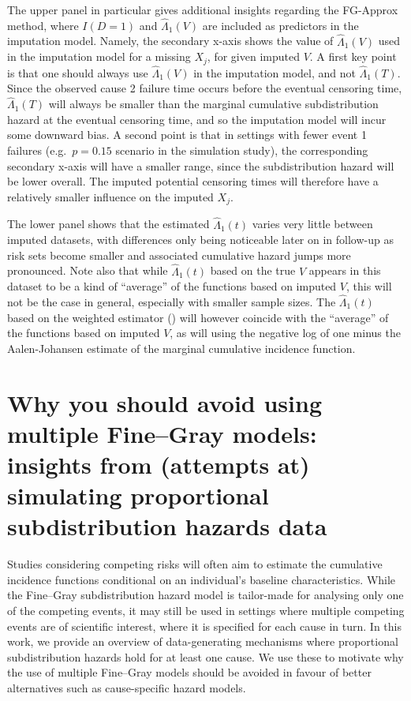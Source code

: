 \documentclass[
  letterpaper,
  DIV=11,
  numbers=noendperiod]{scrreprt}
\begin{document}
The upper panel in particular gives additional insights regarding the
FG-Approx method, where \(I(D = 1)\) and \(\hat{\Lambda}_1(V)\) are
included as predictors in the imputation model. Namely, the secondary
x-axis shows the value of \(\hat{\Lambda}_1(V)\) used in the imputation
model for a missing \(X_j\), for given imputed \(V\). A first key point
is that one should always use \(\hat{\Lambda}_1(V)\) in the imputation
model, and not \(\hat{\Lambda}_1(T)\). Since the observed cause 2
failure time occurs before the eventual censoring time,
\(\hat{\Lambda}_1(T)\) will always be smaller than the marginal
cumulative subdistribution hazard at the eventual censoring time, and so
the imputation model will incur some downward bias. A second point is
that in settings with fewer event 1 failures (e.g.~\(p = 0.15\) scenario
in the simulation study), the corresponding secondary x-axis will have a
smaller range, since the subdistribution hazard will be lower overall.
The imputed potential censoring times will therefore have a relatively
smaller influence on the imputed \(X_j\).

The lower panel shows that the estimated \(\hat{\Lambda}_1(t)\) varies
very little between imputed datasets, with differences only being
noticeable later on in follow-up as risk sets become smaller and
associated cumulative hazard jumps more pronounced. Note also that while
\(\hat{\Lambda}_1(t)\) based on the true \(V\) appears in this dataset
to be a kind of ``average'' of the functions based on imputed \(V\),
this will not be the case in general, especially with smaller sample
sizes. The \(\hat{\Lambda}_1(t)\) based on the weighted estimator
() will however coincide with the ``average'' of the functions based
on imputed \(V\), as will using the negative log of one minus the
Aalen-Johansen estimate of the marginal cumulative incidence function.


\chapter{Why you should avoid using multiple Fine--Gray models: insights
from (attempts at) simulating proportional subdistribution hazards
data}\label{sec-chap-FG-DGM}

Studies considering competing risks will often aim to estimate the
cumulative incidence functions conditional on an individual's baseline
characteristics. While the Fine--Gray subdistribution hazard model is
tailor-made for analysing only one of the competing events, it may still
be used in settings where multiple competing events are of scientific
interest, where it is specified for each cause in turn. In this work, we
provide an overview of data-generating mechanisms where proportional
subdistribution hazards hold for at least one cause. We use these to
motivate why the use of multiple Fine--Gray models should be avoided in
favour of better alternatives such as cause-specific hazard models.
\end{document}
